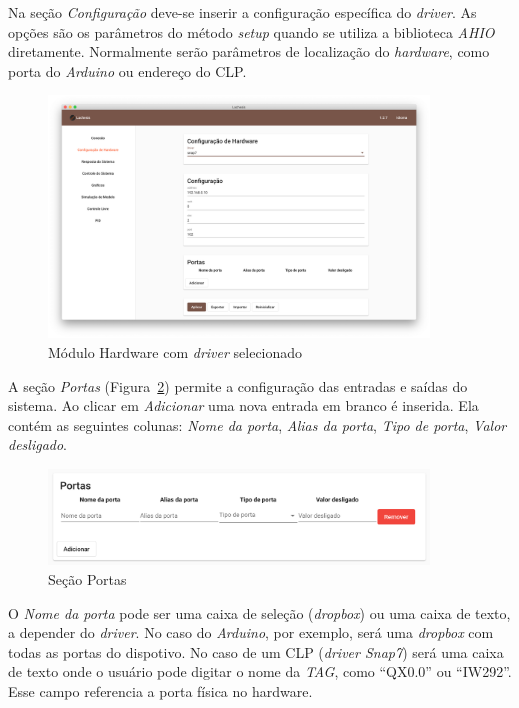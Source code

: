Na seção \textit{Configuração} deve-se inserir a configuração específica do
\textit{driver}. As opções são os parâmetros do método \textit{setup} quando se
utiliza a biblioteca \textit{AHIO} diretamente. Normalmente serão parâmetros de
localização do \textit{hardware}, como porta do \textit{Arduino} ou endereço do
CLP\@.

\begin{figure}[ht!]
    \centering
    \includegraphics[width=0.9\textwidth]{imgs/hardware2}
    \caption[Módulo Hardware com driver selecionado]{Módulo Hardware com \textit{driver} selecionado}%
    \label{fig:hardware2}
\end{figure}

A seção \textit{Portas} (Figura~\ref{fig:hardware3}) permite a configuração das
entradas e saídas do sistema. Ao clicar em \textit{Adicionar} uma nova entrada
em branco é inserida. Ela contém as seguintes colunas: \textit{Nome da porta},
\textit{Alias da porta}, \textit{Tipo de porta}, \textit{Valor desligado}.

\begin{figure}[ht!]
    \centering
    \includegraphics[width=0.9\textwidth]{imgs/hardware3}
    \caption[Seção Portas]{Seção Portas}%
    \label{fig:hardware3}
\end{figure}

O \textit{Nome da porta} pode ser uma caixa de seleção (\textit{dropbox}) ou uma
caixa de texto, a depender do \textit{driver}. No caso do \textit{Arduino}, por
exemplo, será uma \textit{dropbox} com todas as portas do dispotivo. No caso de
um CLP (\textit{driver Snap7}) será uma caixa de texto onde o usuário pode
digitar o nome da \textit{TAG}, como \enquote{QX0.0} ou \enquote{IW292}. Esse
campo referencia a porta física no hardware.

